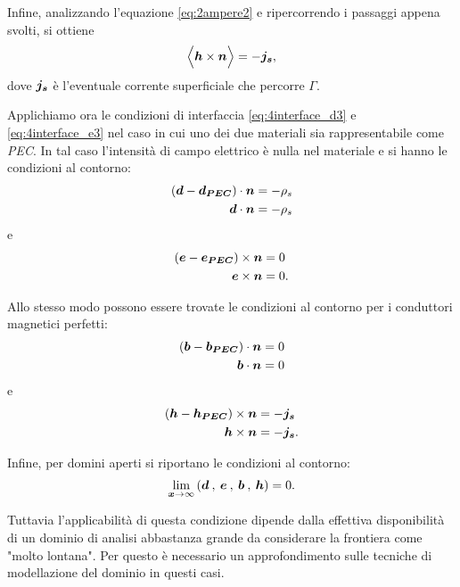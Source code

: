 Infine, analizzando l'equazione \eqref{eq:2ampere2} e ripercorrendo i passaggi appena svolti, si ottiene
\begin{equation}
\label{eq:4interface_h}
\Bigl\langle\boldsymbol{h} \times \boldsymbol{n} \Bigr\rangle = -\boldsymbol{j_s},
\end{equation}
dove $\boldsymbol{j_s}$ è l'eventuale corrente superficiale che percorre $\Gamma$.

Applichiamo ora le condizioni di interfaccia \eqref{eq:4interface_d3} e \eqref{eq:4interface_e3} nel caso in cui uno dei due materiali sia rappresentabile come \textit{PEC}. In tal caso l'intensità di campo elettrico è nulla nel materiale e si hanno le condizioni al contorno:
\begin{align}
\label{eq:4pec_d}
\left( \boldsymbol{d} -\boldsymbol{d_{PEC}}\right)\cdot \boldsymbol{n} &= -\rho_s\nonumber\\
\boldsymbol{d}\cdot \boldsymbol{n} &= -\rho_s
\end{align}
e
\begin{align}
\label{eq:4pec_e}
\left( \boldsymbol{e} -\boldsymbol{e_{PEC}}\right)\times \boldsymbol{n} &= 0\nonumber\\
\boldsymbol{e}\times \boldsymbol{n} &= 0.
\end{align}

Allo stesso modo possono essere trovate le condizioni al contorno per i conduttori magnetici perfetti:
\begin{align}
\label{eq:4pmc_b}
\left( \boldsymbol{b} -\boldsymbol{b_{PEC}}\right)\cdot \boldsymbol{n} &= 0\nonumber\\
\boldsymbol{b}\cdot \boldsymbol{n} &= 0
\end{align}
e
\begin{align}
\label{eq:4pec_h}
\left( \boldsymbol{h} -\boldsymbol{h_{PEC}}\right) \times \boldsymbol{n} &= -\boldsymbol{j_s} \nonumber\\
\boldsymbol{h} \times \boldsymbol{n} &= -\boldsymbol{j_s}.
\end{align}

Infine, per domini aperti si riportano le condizioni al contorno:
\begin{align}
\label{eq:4cond_inf}
\lim_{\boldsymbol{x}\rightarrow \infty} \left( \boldsymbol{d}\:,\:\boldsymbol{e}\:,\:\boldsymbol{b}\:,\:\boldsymbol{h} \right) = 0.
\end{align}

Tuttavia l'applicabilità di questa condizione dipende dalla effettiva disponibilità di un dominio di analisi abbastanza grande da considerare la frontiera come "molto lontana".
Per questo è necessario un approfondimento sulle tecniche di modellazione del dominio in questi casi.

